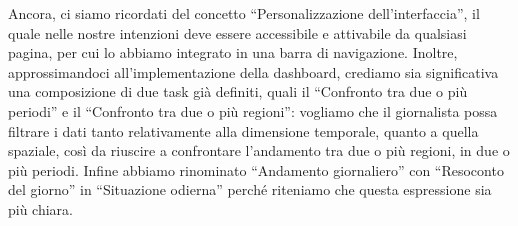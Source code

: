 Ancora, ci siamo ricordati del concetto ``Personalizzazione dell'interfaccia'', il quale nelle nostre intenzioni deve essere accessibile e attivabile da qualsiasi pagina, per cui lo abbiamo integrato in una barra di navigazione.
Inoltre, approssimandoci all'implementazione della dashboard, crediamo sia significativa una composizione di due task già definiti, quali il ``Confronto tra due o più periodi'' e il ``Confronto tra due o più regioni'': vogliamo che il giornalista possa filtrare i dati tanto relativamente alla dimensione temporale, quanto a quella spaziale, così da riuscire a confrontare l'andamento tra due o più regioni, in due o più periodi.
Infine abbiamo rinominato ``Andamento giornaliero'' con ``Resoconto del giorno'' in ``Situazione odierna'' perché riteniamo che questa espressione sia più chiara. 
